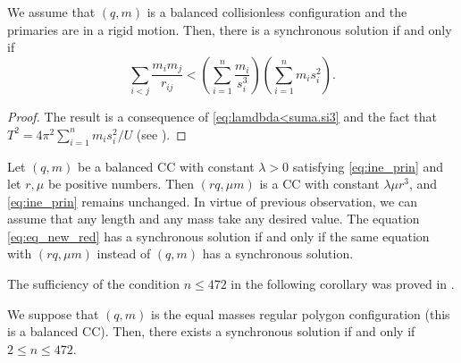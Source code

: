 \documentclass[smallcondensed]{svjour3}
\begin{document}
\begin{corollary}
We assume that $(q,m)$ is a balanced collisionless configuration and  the primaries are in a rigid motion. Then, there is a synchronous solution if and only if
 \begin{equation}\label{eq:ine_prin}
 \sum_{i<j}\frac{m_im_j}{r_{ij}}<\left(\sum_{i=1}^n\frac{m_i}{s_i^3}\right)\left(\sum_{i=1}^nm_is_i^2\right).
\end{equation}
\end{corollary}

\begin{proof}
The result is a consequence of \eqref{eq:lamdbda<suma.si3} and the fact that $T^2=4\pi^2 \sum_{i=1}^{n}m_is_i^2/U$   (see \cite[p. 109]{JaumeLlibre276}).
\end{proof}


\begin{remark}\label{com:sincronicas}

Let $(q,m)$  be a  balanced  CC  with constant $\lambda>0$ satisfying \eqref{eq:ine_prin} and let $r,\mu$ be positive numbers. Then  $(rq,\mu m)$ is a CC with constant $\lambda \mu r^3$, and \eqref{eq:ine_prin} remains unchanged. In virtue of previous observation, we can assume that any  length and any mass take any  desired value. The equation \eqref{eq:eq_new_red} has a synchronous solution if and only if the same equation with $(rq,\mu m)$ instead of $(q,m)$ has a synchronous solution.

\end{remark}





The sufficiency of the condition $n\leq 472$ in the following corollary  was proved in \cite{li2013characterization}.

\begin{corollary}\label{cor:nleq472}
We suppose that $(q,m)$ is the equal masses regular polygon configuration  (this is a balanced CC). Then, there exists a synchronous solution if and only if $2\leq n\leq 472$.
\end{corollary}
\end{document}

